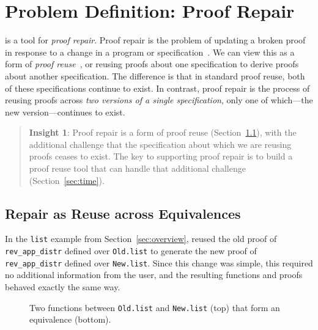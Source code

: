\section{Problem Definition: Proof Repair}
\label{sec:key1}

\toolname is a tool for \textit{proof repair}.
Proof repair is the problem of updating a broken proof in response to a change in a program or specification~\cite{PGL-045, pumpkinpatch}.
We can view this as a form of 
\textit{proof reuse}~\cite{Ringer2019, felty1994generalization, caplan1995logical, pons2000generalization, johnsen2004theorem}, %
or reusing proofs about one specification to derive proofs about another specification.
The difference is that in standard proof reuse, both of these specifications continue to exist.
In contrast, proof repair is the process of reusing proofs across \textit{two versions of a single specification},
only one of which---the new version---continues to exist.

\begin{quote}
\textbf{Insight 1}:
Proof repair is a form of proof reuse (Section~\ref{sec:repair}), with the additional
challenge that the specification about which
we are reusing proofs ceases to exist.
The key to supporting proof repair is to build a proof reuse
tool that can handle that additional challenge (Section~\ref{sec:time}).
\end{quote}

\subsection{Repair as Reuse across Equivalences}
\label{sec:repair}

In the \lstinline{list} example from Section~\ref{sec:overview}, \toolname
reused the old proof of \lstinline{rev_app_distr} defined over \lstinline{Old.list}
to generate the new proof of \lstinline{rev_app_distr} defined over \lstinline{New.list}.
Since this change was simple, this required no additional information from the user, and the resulting functions
and proofs behaved exactly the same way.

\begin{figure}
\vspace{-0.2cm}
\caption{Two functions between \lstinline{Old.list} and \lstinline{New.list} (top) that form an equivalence (bottom).}
\label{fig:equivalence}
\end{figure}

